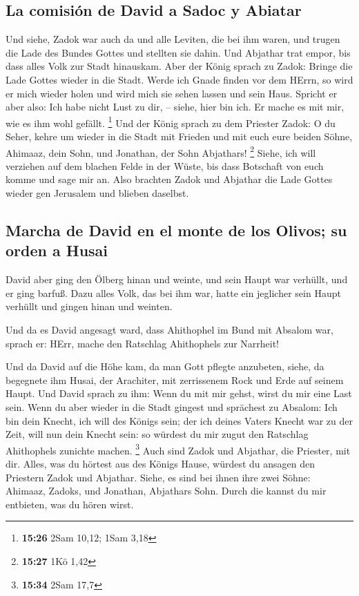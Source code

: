 \hypertarget{la-comisiuxf3n-de-david-a-sadoc-y-abiatar}{%
\subsection{La comisión de David a Sadoc y
Abiatar}\label{la-comisiuxf3n-de-david-a-sadoc-y-abiatar}}

 Und siehe, Zadok war auch da und alle Leviten, die bei
ihm waren, und trugen die Lade des Bundes Gottes und stellten sie dahin.
Und Abjathar trat empor, bis dass alles Volk zur Stadt hinauskam.
 Aber der König sprach zu Zadok: Bringe die Lade Gottes
wieder in die Stadt. Werde ich Gnade finden vor dem HErrn, so wird er
mich wieder holen und wird mich sie sehen lassen und sein Haus.
 Spricht er aber also: Ich habe nicht Lust zu dir, --
siehe, hier bin ich. Er mache es mit mir, wie es ihm wohl gefällt.
\footnote{\textbf{15:26} 2Sam 10,12; 1Sam 3,18}  Und der
König sprach zu dem Priester Zadok: O du Seher, kehre um wieder in die
Stadt mit Frieden und mit euch eure beiden Söhne, Ahimaaz, dein Sohn,
und Jonathan, der Sohn Abjathars! \footnote{\textbf{15:27} 1Kö 1,42}
 Siehe, ich will verziehen auf dem blachen Felde in der
Wüste, bis dass Botschaft von euch komme und sage mir an.
 Also brachten Zadok und Abjathar die Lade Gottes wieder
gen Jerusalem und blieben daselbst.

\hypertarget{marcha-de-david-en-el-monte-de-los-olivos-su-orden-a-husai}{%
\subsection{Marcha de David en el monte de los Olivos; su orden a
Husai}\label{marcha-de-david-en-el-monte-de-los-olivos-su-orden-a-husai}}

 David aber ging den Ölberg hinan und weinte, und sein
Haupt war verhüllt, und er ging barfuß. Dazu alles Volk, das bei ihm
war, hatte ein jeglicher sein Haupt verhüllt und gingen hinan und
weinten.

 Und da es David angesagt ward, dass Ahithophel im Bund
mit Absalom war, sprach er: HErr, mache den Ratschlag Ahithophels zur
Narrheit!

 Und da David auf die Höhe kam, da man Gott pflegte
anzubeten, siehe, da begegnete ihm Husai, der Arachiter, mit zerrissenem
Rock und Erde auf seinem Haupt.  Und David sprach zu ihm:
Wenn du mit mir gehst, wirst du mir eine Last sein.  Wenn
du aber wieder in die Stadt gingest und sprächest zu Absalom: Ich bin
dein Knecht, ich will des Königs sein; der ich deines Vaters Knecht war
zu der Zeit, will nun dein Knecht sein: so würdest du mir zugut den
Ratschlag Ahithophels zunichte machen. \footnote{\textbf{15:34} 2Sam
  17,7}  Auch sind Zadok und Abjathar, die Priester, mit
dir. Alles, was du hörtest aus des Königs Hause, würdest du ansagen den
Priestern Zadok und Abjathar.  Siehe, es sind bei ihnen
ihre zwei Söhne: Ahimaaz, Zadoks, und Jonathan, Abjathars Sohn. Durch
die kannst du mir entbieten, was du hören wirst.

